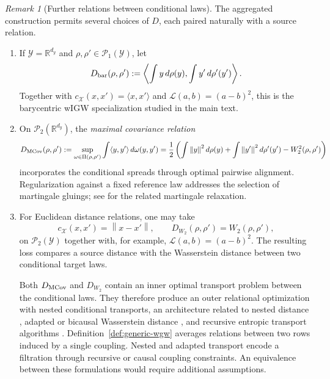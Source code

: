 \documentclass[11pt]{article}
\newcommand{\R}{\mathbb R}
\newcommand{\cP}{\mathcal P}
\newcommand{\norm}[1]{\left\lVert #1\right\rVert}
\theoremstyle{plain}
\theoremstyle{definition}
\theoremstyle{remark}
\newtheorem{remark}[theorem]{Remark}
\begin{document}
\begin{remark}[Further relations between conditional laws]
\label{rem:conditional-law-relations}
The aggregated construction permits several choices of $D$, each paired naturally
with a source relation.
\begin{enumerate}[label=(\roman*),leftmargin=2em]
\item If $\mathcal Y=\R^{d_y}$ and $\rho,\rho'\in\cP_1(\mathcal Y)$, let
\[
 D_{\rm bar}(\rho,\rho')
 :=\left\langle\int y\,d\rho(y),\int y'\,d\rho'(y')\right\rangle.
\]
Together with $c_{\mathcal X}(x,x')=\langle x,x'\rangle$ and
$\mathcal L(a,b)=(a-b)^2$, this is the barycentric wIGW specialization studied in
the main text.

\item On $\cP_2(\R^{d_y})$, the \emph{maximal covariance relation}
\[
 D_{\rm MCov}(\rho,\rho')
 :=\sup_{\omega\in\Pi(\rho,\rho')}
   \int\langle y,y'\rangle\,d\omega(y,y')
 =\frac12\left(
   \int\norm y^2d\rho(y)+\int\norm{y'}^2d\rho'(y')
   -W_2^2(\rho,\rho')\right)
\]
incorporates the conditional spreads through optimal pairwise alignment.
Regularization against a fixed reference law addresses the selection of martingale
gluings; see \cite{GuoNilssonWiesel2025} for the related martingale relaxation.

\item For Euclidean distance relations, one may take
\[
 c_{\mathcal X}(x,x')=\norm{x-x'},
 \qquad D_{W_2}(\rho,\rho')=W_2(\rho,\rho'),
\]
on $\cP_2(\mathcal Y)$ together with, for example,
$\mathcal L(a,b)=(a-b)^2$. The resulting loss compares a source distance with the
Wasserstein distance between two conditional target laws.

Both $D_{\rm MCov}$ and $D_{W_2}$ contain an inner optimal transport problem between
the conditional laws. They therefore produce an outer relational optimization with
nested conditional transports, an architecture related to nested distance
\cite{PflugPichler2012}, adapted or bicausal Wasserstein distance
\cite{BackhoffBartlBeiglbockEder2020}, and recursive entropic transport algorithms
\cite{QuTran2021}. Definition~\ref{def:generic-wgw} averages relations between two
rows induced by a single coupling. Nested and adapted transport encode a filtration
through recursive or causal coupling constraints. An equivalence between these
formulations would require additional assumptions.


\end{enumerate}
\end{remark}
\end{document}
